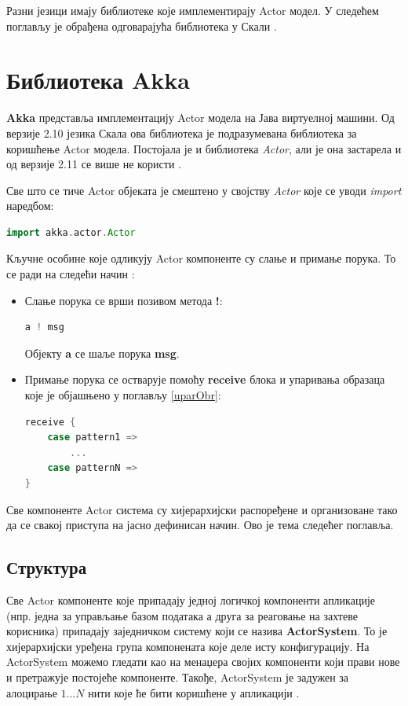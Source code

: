 \documentclass[12pt,oneside]{memoir}
\begin{document}
Разни језици имају библиотеке које имплементирају Actor модел. У следећем поглављу је обрађена одговарајућа библиотека у Скали \cite{progInScala3, carlHewittActor, seven}.

\section{Библиотека Akka}
\label{sec:akka}

\textbf{Akka} представља имплементацију Actor модела на Јава виртуелној машини. Од верзије 2.10 језика Скала ова библиотека је подразумевана библиотека за коришћење Actor модела. Постојала је и библиотека \textit{Actor}, али је она застарела и од верзије 2.11 се више не користи \cite{akkaMarius}.

Све што се тиче Actor објеката је смештено у својству \textit{Actor} које се уводи \textit{import} наредбом:
\begin{lstlisting}[language=Scala]
import akka.actor.Actor
\end{lstlisting}

Кључне особине које одликују Actor компоненте су слање и примање порука. То се ради на следећи начин \cite{progInScala3}: 
\begin{itemize}
\item Слање порука се врши позивом метода \textbf{!}:
\begin{lstlisting}[language=Scala]
a ! msg
\end{lstlisting}
Објекту \textbf{a} се шаље порука \textbf{msg}.
\item Примање порука се остварује помоћу \textbf{receive} блока и упаривања образаца које је објашњено у поглављу \ref{uparObr}:
\begin{lstlisting}[language=Scala]
receive {
	case pattern1 => 
		...
	case patternN => 
}
\end{lstlisting}
\end{itemize}

Све компоненте Actor система су хијерархијски распоређене и организоване тако да се свакој приступа на јасно дефинисан начин. Ово је тема следећег поглавља.

\subsection{Структура}
\label{subsec:struktura}

Све Actor компоненте које припадају једној логичкој компоненти апликације (нпр. једна за управљање базом података а друга за реаговање на захтеве корисника) припадају заједничком систему који се назива \textbf{ActorSystem}. То је хијерархијски уређена група компонената које деле исту конфигурацију. На ActorSystem можемо гледати као на менаџера својих компоненти који прави нове и претражује постојеће компоненте. Такође, ActorSystem је задужен за алоцирање $1...N$ нити које ће бити коришћене у апликацији \cite{progInScala3, akkaDoc}.
\end{document}
